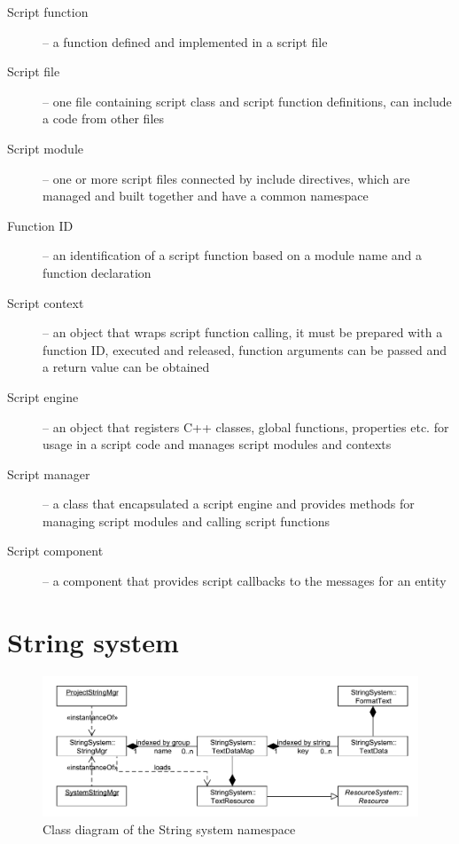 \documentclass[a4paper, 12pt]{report}
\begin{document}
\begin{description}
	\item[Script function] -- a function defined and implemented in a script file
	\item[Script file] -- one file containing script class and script function definitions, can include a code from other files
	\item[Script module] -- one or more script files connected by include directives, which are managed and built together and have a common namespace
	\item[Function ID] -- an identification of a script function based on a module name and a function declaration
	\item[Script context] -- an object that wraps script function calling, it must be prepared with a function ID, executed and released, function arguments can be passed and a return value can be obtained
	\item[Script engine] -- an object that registers C++ classes, global functions, properties etc. for usage in a script code and manages script modules and contexts
	\item[Script manager] -- a class that encapsulated a script engine and provides methods for managing script modules and calling script functions
	\item[Script component] -- a component that provides script callbacks to the messages for an entity
\end{description}


\chapter{String system}

\begin{figure}[htbp]
	\centering
		\includegraphics[width=1\textwidth]{StringSystemClassDiagram.pdf}
	\caption{Class diagram of the String system namespace}
	\label{fig:stringsystem-diagram}
\end{figure}
\end{document}
